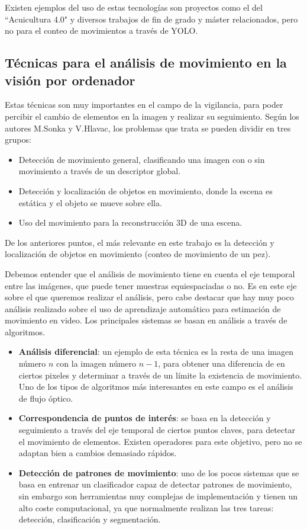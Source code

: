 Existen ejemplos del uso de estas tecnologías son proyectos como el del  ``Acuicultura 4.0"\cite{Acuicultura} y diversos trabajos de fin de grado y máster relacionados, pero no para el conteo de movimientos a través de YOLO.

\clearpage
\subsection{Técnicas para el análisis de movimiento en la visión por ordenador}

Estas técnicas son muy importantes en el campo de la vigilancia, para poder percibir el cambio de elementos en la imagen y realizar su seguimiento. Según los autores M.Sonka y V.Hlavac\cite{sonkaImageProcessingAnalysis2013}, los problemas que 
trata se pueden dividir en tres grupos:

\begin{itemize}
    \item Detección de movimiento general, clasificando una imagen con o sin movimiento a través de un descriptor global.
    \item Detección y localización de objetos en movimiento, donde la escena es estática y el objeto se mueve sobre ella.
    \item Uso del movimiento para la reconstrucción 3D de una escena.
\end{itemize}

De los anteriores puntos, el más relevante en este trabajo es la detección y localización de objetos en movimiento (conteo de movimiento de un pez).

Debemos entender que el análisis de movimiento tiene en cuenta el eje temporal entre las imágenes, que puede tener muestras equiespaciadas o no. Es en este eje sobre el que queremos realizar el análisis, pero 
cabe destacar que hay muy poco análisis realizado sobre el uso de aprendizaje automático para estimación de movimiento en video. Los principales sistemas se basan en análisis a través de algoritmos.

\begin{itemize}
    \item \textbf{Análisis diferencial}: un ejemplo de esta técnica es la resta de una imagen número $n$ con la imagen número $n-1$, para obtener una diferencia de en ciertos pixeles y determinar a través de un límite 
    la existencia de movimiento. Uno de los tipos de algoritmos más interesantes en este campo es el análisis de flujo óptico.
    \item \textbf{Correspondencia de puntos de interés}: se basa en la detección y seguimiento a través del eje temporal de ciertos puntos claves, para detectar el movimiento de elementos. Existen operadores para este 
    objetivo, pero no se adaptan bien a cambios demasiado rápidos.
    \item \textbf{Detección de patrones de movimiento}: uno de los pocos sistemas que se basa en entrenar un clasificador capaz de detectar patrones de movimiento, sin embargo son herramientas muy complejas 
    de implementación y tienen un alto coste computacional, ya que normalmente realizan las tres tareas: detección, clasificación y segmentación.
\end{itemize}

